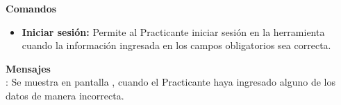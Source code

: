 \textbf{\textcolor[rgb]{0, 0, 0.545098}{Comandos}}	%
\begin{itemize}
	\item \textbf{\textcolor[rgb]{0, 0, 0.545098}{Iniciar sesión:}}  Permite al Practicante iniciar sesión en la herramienta cuando la información ingresada en los campos obligatorios sea correcta. 
\end{itemize}
\vspace{1em}

\textbf{\textcolor[rgb]{0, 0, 0.545098}{Mensajes}}\\

\textbf{}: Se muestra en pantalla , cuando el Practicante haya ingresado alguno de los datos de manera incorrecta.\\

\clearpage